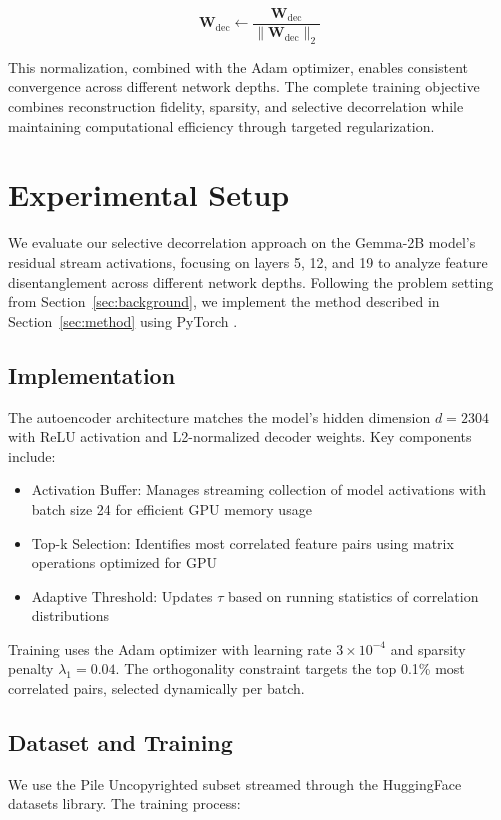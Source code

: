 \documentclass{article} %
\begin{document}
\begin{equation}
    \mathbf{W}_{\text{dec}} \leftarrow \frac{\mathbf{W}_{\text{dec}}}{\|\mathbf{W}_{\text{dec}}\|_2}
\end{equation}

This normalization, combined with the Adam optimizer, enables consistent convergence across different network depths. The complete training objective combines reconstruction fidelity, sparsity, and selective decorrelation while maintaining computational efficiency through targeted regularization.

\section{Experimental Setup}
\label{sec:experimental}

We evaluate our selective decorrelation approach on the Gemma-2B model's residual stream activations, focusing on layers 5, 12, and 19 to analyze feature disentanglement across different network depths. Following the problem setting from Section~\ref{sec:background}, we implement the method described in Section~\ref{sec:method} using PyTorch \cite{paszke2019pytorch}.

\subsection{Implementation}
The autoencoder architecture matches the model's hidden dimension $d=2304$ with ReLU activation and L2-normalized decoder weights. Key components include:

\begin{itemize}
    \item Activation Buffer: Manages streaming collection of model activations with batch size 24 for efficient GPU memory usage
    \item Top-k Selection: Identifies most correlated feature pairs using matrix operations optimized for GPU
    \item Adaptive Threshold: Updates $\tau$ based on running statistics of correlation distributions
\end{itemize}

Training uses the Adam optimizer \cite{kingma2014adam} with learning rate $3\times10^{-4}$ and sparsity penalty $\lambda_1=0.04$. The orthogonality constraint targets the top 0.1\% most correlated pairs, selected dynamically per batch.

\subsection{Dataset and Training}
We use the Pile Uncopyrighted subset \cite{Gao2020ThePA} streamed through the HuggingFace datasets library. The training process:
\end{document}
